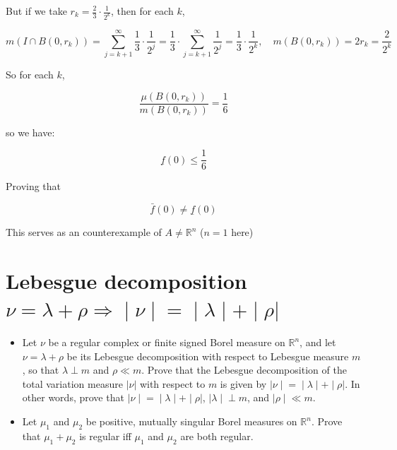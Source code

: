 \documentclass{qlnotes-export}
\begin{document}
\begin{example}
But if we take \(r_{k} = \frac{2}{3} \cdot \frac{1}{2^{k}}\), then for each \(k\),

\[m(I \cap B(0,r_{k})) = \sum\limits_{j = k + 1}^{\infty}\frac{1}{3} \cdot \frac{1}{2^{j}} = \frac{1}{3} \cdot \sum\limits_{j = k + 1}^{\infty}\frac{1}{2^{j}} = \frac{1}{3} \cdot \frac{1}{2^{k}},\quad m(B\left( {0,r_{k}} \right)) = 2r_{k} = \frac{2}{2^{k}}\]

So for each \(k\),

\[\frac{\mu(B(0,r_{k}))}{m(B(0,r_{k}))} = \frac{1}{6}\]

so we have:

\[\underset{¯}{f}(0) \leq \frac{1}{6}\]

Proving that

\[\bar{f}(0) \neq \underset{¯}{f}(0)\]

This serves as an counterexample of \(A \neq {\mathbb{R}}^{n}\) (\(n = 1\) here)

\end{example}

\section{\texorpdfstring{Lebesgue decomposition \(\left. \nu = \lambda + \rho\Longrightarrow \middle| \nu \middle| = \middle| \lambda \middle| + \middle| \rho| \right.\)}{Lebesgue decomposition \textbackslash left. \textbackslash nu = \textbackslash lambda + \textbackslash rho\textbackslash Longrightarrow \textbackslash middle\textbar{} \textbackslash nu \textbackslash middle\textbar{} = \textbackslash middle\textbar{} \textbackslash lambda \textbackslash middle\textbar{} + \textbackslash middle\textbar{} \textbackslash rho\textbar{} \textbackslash right.}}\label{lebesgue-decomposition-nulambdarhoimplies-nulambdarho}

\begin{itemize}
\item
  Let \(\nu\) be a regular complex or finite signed Borel measure on \({\mathbb{R}}^{n}\), and let \(\nu = \lambda + \rho\) be its Lebesgue decomposition with respect to Lebesgue measure \(m\), so that \(\lambda \perp m\) and \(\rho \ll m\). Prove that the Lebesgue decomposition of the total variation measure \(|\nu|\) with respect to \(m\) is given by \(\left. |\nu \middle| = \middle| \lambda \middle| + \middle| \rho| \right.\). In other words, prove that \(\left. |\nu \middle| = \middle| \lambda \middle| + \middle| \rho| \right.\), \(\left. |\lambda \middle| \perp m \right.\), and \(\left. |\rho \middle| \ll m \right.\).
\item
  Let \(\mu_{1}\) and \(\mu_{2}\) be positive, mutually singular Borel measures on \({\mathbb{R}}^{n}\). Prove that \(\mu_{1} + \mu_{2}\) is regular iff \(\mu_{1}\) and \(\mu_{2}\) are both regular.
\end{itemize}
\end{document}
